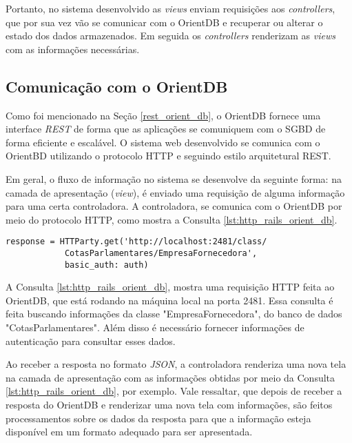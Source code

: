 Portanto, no sistema desenvolvido as \textit{views} enviam requisições aos \textit{controllers}, que por sua vez vão se comunicar com o OrientDB e recuperar ou alterar o estado dos dados armazenados. Em seguida os \textit{controllers} renderizam as \textit{views} com as informações necessárias.

\subsection{Comunicação com o OrientDB} \label{orient-communication}

	Como foi mencionado na Seção \ref{rest_orient_db}, o OrientDB fornece uma interface \textit{REST} de forma que as aplicações se comuniquem com o SGBD de forma eficiente e escalável. O sistema web desenvolvido se comunica com o OrientBD utilizando o protocolo HTTP e seguindo estilo arquitetural REST.
	
	Em geral, o fluxo de informação no sistema se desenvolve da seguinte forma: na camada de apresentação (\textit{view}), é enviado uma requisição de alguma informação para uma certa controladora. A controladora, se comunica com o OrientDB por meio do protocolo HTTP, como mostra a Consulta \ref{lst:http_rails_orient_db}.

\begin{lstlisting}[label={lst:http_rails_orient_db}, caption={Exemplo de consulta no OrientDB para retornar informações da classe de empresas fornecedoras.},captionpos=b]
response = HTTParty.get('http://localhost:2481/class/
			CotasParlamentares/EmpresaFornecedora', 
			basic_auth: auth)
\end{lstlisting}

A Consulta \ref{lst:http_rails_orient_db}, mostra uma requisição HTTP feita ao OrientDB, que está rodando na máquina local na porta 2481. Essa consulta é feita buscando informações da classe "EmpresaFornecedora", do banco de dados "CotasParlamentares". Além disso é necessário fornecer informações de autenticação para consultar esses dados.

Ao receber a resposta no formato \textit{JSON}, a controladora renderiza uma nova tela na camada de apresentação com as informações obtidas por meio da Consulta \ref{lst:http_rails_orient_db}, por exemplo. Vale ressaltar, que depois de receber a resposta do OrientDB e renderizar uma nova tela com informações, são feitos processamentos sobre os dados da resposta para que a informação esteja disponível em um formato adequado para ser apresentada.

